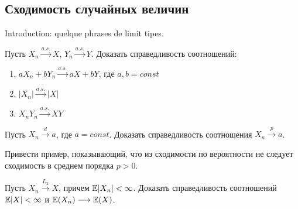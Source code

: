 \subsection{Сходимость случайных величин}

Introduction: quelque phrases de limit tipes.


\begin{problem}
Пусть $X_n \overset{a.s.}{\longrightarrow} X$, $Y_n \overset{a.s.}{\longrightarrow} Y$. Доказать справедливость соотношений:
\begin{enumerate}
\item $a X_n + b Y_n \overset{a.s.}{\longrightarrow} a X + b Y$, где  $a, b = const$
\item $|X_n| \overset{a.s.}{\longrightarrow} |X|$
\item $X_n Y_n \overset{a.s.}{\longrightarrow} XY$
\end{enumerate}

\end{problem}

\begin{problem}
Пусть $X_n \overset{d}{\longrightarrow} a$, где $a = const$. Доказать справедливость соотношения $X_n \overset{p}{\longrightarrow} a$.
\end{problem}

\begin{problem}
Привести пример, показывающий, что из сходимости по вероятности не следует сходимость в среднем порядка $p > 0$.
\end{problem}

\begin{problem}
Пусть $X_n \overset{L_2}{\longrightarrow} X$, причем $\mathrm{{\mathbb E}} |X_n| < \infty$. Доказать справедливость соотношений $\mathrm{{\mathbb E}} |X| < \infty$ и $\mathrm{{\mathbb E}} (X_n)\longrightarrow \mathrm{{\mathbb E}}(X)$.
\end{problem}

